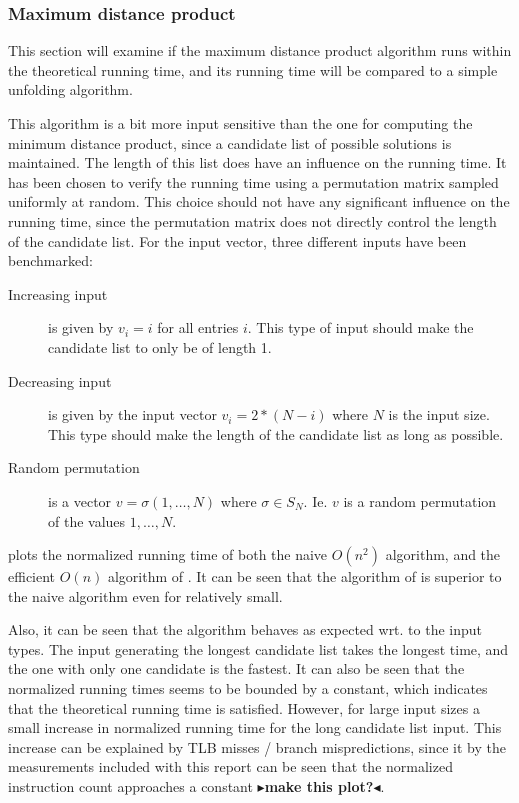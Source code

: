 \documentclass[twoside,11pt,openright]{report}
\newcommand{\todo}[1]{{\color[rgb]{.5,0,0}\textbf{$\blacktriangleright$#1$\blacktriangleleft$}}}
\begin{document}
\subsubsection{Maximum distance product}
This section will examine if the maximum distance product algorithm runs within the theoretical running time, and its running time will be compared to a simple unfolding algorithm.

This algorithm is a bit more input sensitive than the one for computing the minimum distance product, since a candidate list of possible solutions is maintained. The length of this list does have an influence on the running time. It has been chosen to verify the running time using a permutation matrix sampled uniformly at random. This choice should not have any significant influence on the running time, since the permutation matrix does not directly control the length of the candidate list. For the input vector, three different inputs have been benchmarked:
\begin{description}
  \item[Increasing input] is given by $v_i = i$ for all entries $i$. This type of input should make the candidate list to only be of length 1.
  \item[Decreasing input] is given by the input vector $v_i = 2 * (N - i)$ where $N$ is the input size. This type should make the length of the candidate list as long as possible.
  \item[Random permutation] is a vector $v = \sigma(1, \dots, N)$ where $\sigma \in S_N$. Ie. $v$ is a random permutation of the values $1, \dots, N$.
\end{description}
 plots the normalized running time of both the naive $O(n^2)$ algorithm, and the efficient $O(n)$ algorithm of \cite{Gawrychowski:2012:FAC:2422024.2422048}. It can be seen that the algorithm of \cite{Gawrychowski:2012:FAC:2422024.2422048} is superior to the naive algorithm even for relatively small.

Also, it can be seen that the algorithm behaves as expected wrt. to the input types. The input generating the longest candidate list takes the longest time, and the one with only one candidate is the fastest. It can also be seen that the normalized running times seems to be bounded by a constant, which indicates that the theoretical running time is satisfied. However, for large input sizes a small increase in normalized running time for the long candidate list input. This increase can be explained by TLB misses / branch mispredictions, since it by the measurements included with this report can be seen that the normalized instruction count approaches a constant \todo{make this plot?}.
\end{document}

